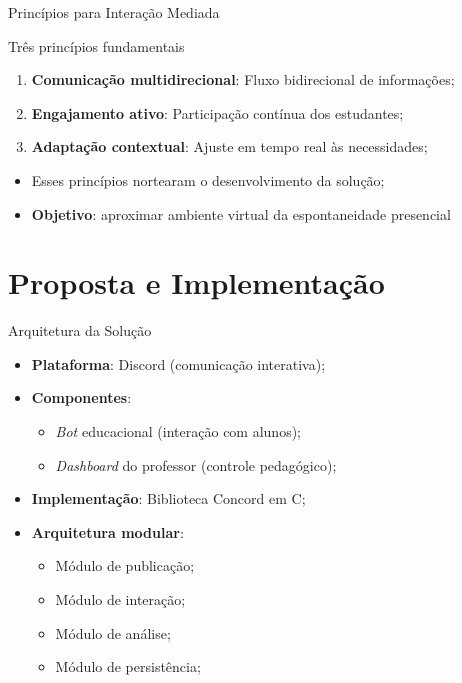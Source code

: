\documentclass[aspectratio=169]{beamer}
\begin{document}
{\begin{frame}{Princípios para Interação Mediada}
  \begin{block}{Três princípios fundamentais \citep{prince2004}}
  \begin{enumerate}
  \item \textbf{Comunicação multidirecional}: Fluxo bidirecional de informações;
  \item \textbf{Engajamento ativo}: Participação contínua dos estudantes;
  \item \textbf{Adaptação contextual}: Ajuste em tempo real às necessidades;
  \end{enumerate}
  \end{block}
  
  \begin{itemize}
  \item Esses princípios nortearam o desenvolvimento da solução;
  \item \textbf{Objetivo}: aproximar ambiente virtual da espontaneidade presencial
  \end{itemize}
\end{frame}

\section{Proposta e Implementação}

\begin{frame}{Arquitetura da Solução}
  \begin{itemize}
  \item \textbf{Plataforma}: Discord (comunicação interativa);
  \item \textbf{Componentes}:
    \begin{itemize}
    \item \textit{Bot} educacional (interação com alunos);
    \item \textit{Dashboard} do professor (controle pedagógico);
    \end{itemize}
  \item \textbf{Implementação}: Biblioteca Concord em C;
  \item \textbf{Arquitetura modular}:
    \begin{itemize}
    \item Módulo de publicação;
    \item Módulo de interação;
    \item Módulo de análise;
    \item Módulo de persistência;
    \end{itemize}
  \end{itemize}
\end{frame}

}
\end{document}
